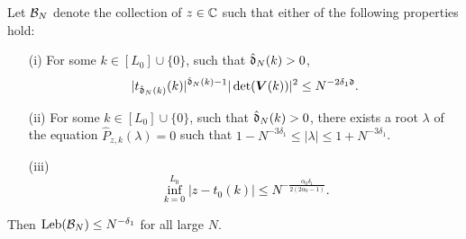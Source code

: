 \documentclass{amsart}
\numberwithin{equation}{section}
\def\corEE{\textcolor{amethyst}}
\def\corEE{}
\def\corOZ{}
\def\corABrev{\textcolor{black}}
\begin{document}
\begin{lemma}\label{lem:bad-z}
Let $\mathcal{B}_N$ denote the collection of $z \in \mathbb{C}$ such that either of the following properties hold:
\begin{enumerate}
\item[(i)] For some $k \in [L_0] \cup \{0\}$, such that $\hat{\mathfrak{d}}_N(k) >0$,
\[
|t_{\hat\gd_N(k)}(k)|^{\hat\gd_N(k)-1}
\corEE{|\det( {\bm V}(k))|^2}
\le N^{-2\delta_1\corOZ{\gd}}.
\]
\item[(ii)] For some $k \in [L_0]\cup\{0\}$, such that $\hat{\mathfrak{d}}_N(k) >0$, there exists a root $\lambda$ of the equation $\hat{P}_{z,k}(\lambda)=0$ such that $1-N^{-3\delta_1} \le |\lambda| \le 1+N^{-3\delta_1}$. %

\item[(iii)]\corABrev{
\[
\inf_{k=0}^{L_0} |z - t_0(k)| \le N^{-\frac{\alpha_0\delta_1}{2(2\alpha_0-1)}}.
\]}
\end{enumerate}
Then $\mathrm{Leb}(\mathcal{B}_N) \le N^{-\delta_1}$ for all large $N$.
\end{lemma}
\end{document}
